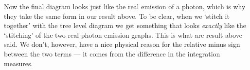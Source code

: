 Now the final diagram looks just like the real emission of a photon, which is why they take the same form in our result above. To be clear, when we `stitch it together' with the tree level diagram we get something that looks \textit{exactly} like the `stitching' of the two real photon emission graphs. This is what are result above said.  We don't, however, have a nice physical reason for the relative minus sign between the two terms --- it comes from the difference in the integration measures. 